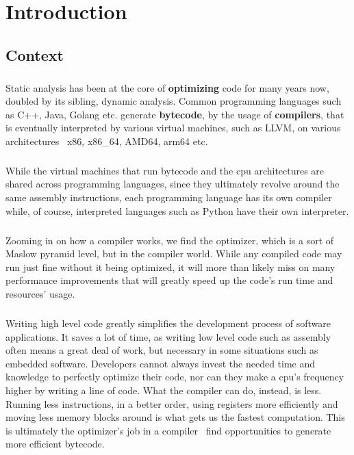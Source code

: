 \chapter{Introduction} 
\section{Context}
\paragraph*{}
Static analysis has been at the core of \textbf{optimizing} code for many years now, doubled by its sibling, dynamic analysis. Common programming languages such as C++, Java, Golang etc. generate \textbf{bytecode}, by the usage of \textbf{compilers}, that is eventually interpreted by various virtual machines, such as LLVM, on various architectures \textemdash \ x86, x86\_64, AMD64, arm64 etc.

\paragraph*{}
While the virtual machines that run bytecode and the cpu architectures are shared across programming languages, since they ultimately revolve around the same assembly instructions, each programming language has its own compiler while, of course, interpreted languages such as Python have their own interpreter.

\paragraph*{}
Zooming in on how a compiler works, we find the optimizer, which is a sort of Maslow pyramid level, but in the compiler world. While any compiled code may run just fine without it being optimized, it will more than likely miss on many performance improvements that will greatly speed up the code's run time and resources' usage.

\paragraph*{}
Writing high level code greatly simplifies the development process of software applications. It saves a lot of time, as writing low level code such as assembly often means a great deal of work, but necessary in some situations such as embedded software. Developers cannot always invest the needed time and knowledge to perfectly optimize their code, nor can they make a cpu's frequency higher by writing a line of code. What the compiler can do, instead, is less. Running less instructions, in a better order, using registers more efficiently and moving less memory blocks around is what gets us the fastest computation. This is ultimately the optimizer's job in a compiler \textemdash \ find opportunities to generate more efficient bytecode.


